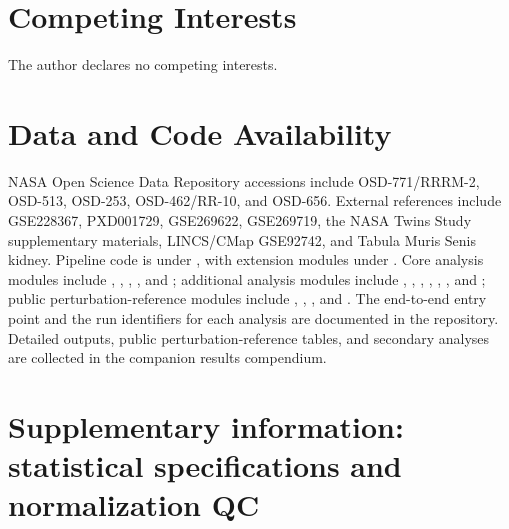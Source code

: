 \documentclass[11pt]{article}
\begin{document}
\section*{Competing Interests}
The author declares no competing interests.

\section*{Data and Code Availability}
NASA Open Science Data Repository accessions include OSD-771/RRRM-2, OSD-513, OSD-253, OSD-462/RR-10, and OSD-656. External references include GSE228367, PXD001729, GSE269622, GSE269719, the NASA Twins Study supplementary materials, LINCS/CMap GSE92742, and Tabula Muris Senis kidney. Pipeline code is under , with extension modules under . Core analysis modules include , , , , and ; additional analysis modules include , , , , , , and ; public perturbation-reference modules include , , , and . The end-to-end entry point and the run identifiers for each analysis are documented in the repository. Detailed outputs, public perturbation-reference tables, and secondary analyses are collected in the companion results compendium.

\clearpage
\appendix
\setcounter{table}{0}
\setcounter{figure}{0}
\renewcommand{\thetable}{S\arabic{table}}
\renewcommand{\thefigure}{S\arabic{figure}}
\renewcommand{\thesection}{S\arabic{section}}
\setcounter{section}{0}
\section{Supplementary information: statistical specifications and normalization QC}\label{app:specs}
\end{document}
